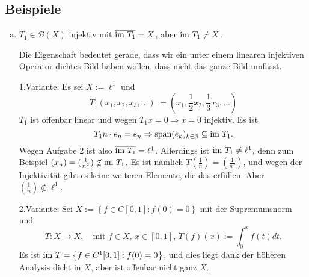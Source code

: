 \documentclass[ngerman]{article}
\theoremstyle{definition}%
\newcommand{\N}{\mathbb{N}}
\newcommand{\B}{\mathcal{B}} %
\newcommand{\df}{\Rightarrow} %
\newcommand{\im}{\textnormal{im }}
\newcommand{\aufspan}{\textnormal{span}}
\renewcommand{\{ }{\left\lbrace}
\renewcommand{\}}{\right\rbrace}
\begin{document}
\subsection{Beispiele}
\begin{enumerate}[a)]
\item $T_1 \in \B(X)$ injektiv mit $\overline{\im T_1} =X$, aber $\im T_1\not = X$.\par
	Die Eigenschaft bedeutet gerade, dass wir ein unter einem linearen injektiven Operator dichtes Bild haben wollen, dass nicht das ganze Bild umfasst.\par
	1.Variante: 
	Es sei $X := \ell^1$ und 
	$$T_1(x_1,x_2,x_3,\dots) := (x_1,\frac{1}{2}x_2, \frac{1}{3}x_3,\dots)$$
	$T_1$ ist offenbar linear und wegen $T_1x = 0 \df x = 0$ injektiv. Es ist 
	$$T_1n\cdot e_n = e_n \df \aufspan (e_k)_{k\in\N} \subseteq \im T_1.$$
	Wegen Aufgabe  2 ist also $\overline{\im T_1} = \ell^1$. Allerdings ist $\im T_1 \not = \ell^1$, denn zum Beispiel $(x_n) = (\frac{1}{n^2}) \not \in \im T_1$. 
	Es ist nämlich $T(\frac{1}{n}) = (\frac{1}{n^2})$, und wegen der Injektivität gibt es keine weiteren Elemente, die das erfüllen. Aber $(\frac{1}{n})\not \in \ell^1$. \par\bigskip
	2.Variante:
	Sei $X := \{f\in C[0,1] : f(0) = 0\}$ mit der Supremumsnorm und 
	$$T:X\to X,\quad\text{mit } f\in X,\, x\in[0,1],\, T(f)(x):=\int^x_0 f(t) dt.$$
	Es ist $\im T = \{f\in C^1[0,1] : f(0) = 0\}$, und dies liegt dank der höheren Analysis dicht in $X$, aber ist offenbar nicht ganz $X$.
	


\end{enumerate}
\end{document}
